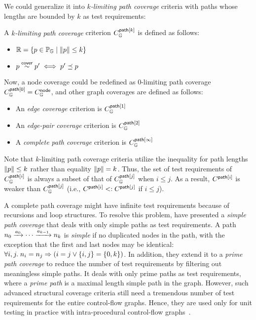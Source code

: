 
We could generalize it into \textit{$k$-limiting path coverage} criteria with
paths whose lengths are bounded by $k$ as test requirements:
\begin{definition}\label{def:k-path-cov}
  A \textit{$k$-limiting path coverage} criterion $C_{\mathbb{G}}^{\textsf{path}[k]}$ is
  defined as follows:
  \begin{itemize}
    \item $\mathbb{R} =
      \{ p \in \mathbb{P}_{\mathbb{G}} \mid \lVert{p}\rVert \leq k \}$
    \item $p \overset{\textsf{cover}}{\sim} p' \iff p' \preceq p$
  \end{itemize}
\end{definition}
%
Now, a node coverage could be redefined as $0$-limiting path coverage
$C_{\mathbb{G}}^{\textsf{path}[0]} = C_{\mathbb{G}}^{\textsf{node}}$, and other graph coverages are defined
as follows:
\begin{itemize}
  \item An \textit{edge coverage} criterion is
    $C_{\mathbb{G}}^{\textsf{path}[1]}$ 
  \item An \textit{edge-pair coverage} criterion is
    $C_{\mathbb{G}}^{\textsf{path}[2]}$ 
  \item A \textit{complete path coverage} criterion is
    $C_{\mathbb{G}}^{\textsf{path}[\infty]}$
\end{itemize}
%
Note that $k$-limiting path coverage criteria utilize the inequality for path
lengths $\lVert{p}\rVert \leq k$ rather than equality $\lVert{p}\rVert = k$.
%
Thus, the set of test requirements of $C_{\mathbb{G}}^{\textsf{path}[i]}$ is always a subset
of that of $C_{\mathbb{G}}^{\textsf{path}[j]}$ when $i \leq j$.
%
As a result, $C_{}^{\textsf{path}[i]}$ is weaker than $C_{\mathbb{G}}^{\textsf{path}[j]}$ (i.e.,
$C_{}^{\textsf{path}[i]} <: C_{}^{\textsf{path}[j]}$ if $i \leq j$).


A complete path coverage might have infinite test requirements because of
recursions and loop structures.
%
To resolve this problem, \citet{testing} have presented a \textit{simple path
coverage} that deals with only simple paths as test requirements.
%
A path $n_0 \xrightarrow{a_0} \cdots \xrightarrow{a_{k-1}} n_k$ is
\textit{simple} if no duplicated nodes in the path, with the exception that the
first and last nodes may be identical: $\forall i, j. \; n_i = n_j
\Rightarrow (i = j \vee \{ i, j \} = \{ 0, k \})$.
%
In addition, they extend it to a \textit{prime path coverage} to reduce the
number of test requirements by filtering out meaningless simple paths.
%
It deals with only prime paths as test requirements, where a \textit{prime path}
is a maximal length simple path in the graph.
%
However, such advanced structural coverage criteria still need a tremendous
number of test requirements for the entire control-flow graphs.
%
Hence, they are used only for unit testing in practice with intra-procedural
control-flow graphs~\cite{unit-test}.

